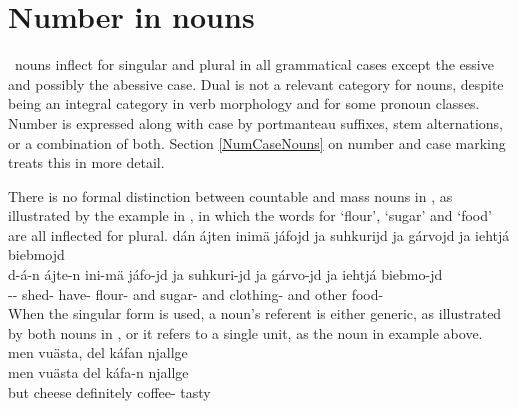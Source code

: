 \section{Number in nouns}\label{numberNouns}
\PS\ nouns inflect for singular and plural in all grammatical cases except the essive and possibly the abessive case. Dual is not a relevant category for nouns, despite being an integral category in verb morphology %
and for some pronoun classes. Number is expressed along with case by portmanteau suffixes, stem alternations, or a combination of both. %
Section \ref{NumCaseNouns} on number and case marking %
treats this in more detail.

There is no formal distinction between countable and mass nouns in \PS, as illustrated by the example in , in which the words for ‘flour’, ‘sugar’ and ‘food’ are all inflected for plural. %
\ea\label{uncountableEx1}
\glll	dán ájten inimä jáfojd ja suhkurijd ja gárvojd ja iehtjá biebmojd\\
	d-á-n ájte-n ini-mä jáfo-jd ja suhkuri-jd ja gárvo-jd ja iehtjá biebmo-jd\\
	-- shed- have- flour- and sugar- and clothing- and other food-\\\nopagebreak
{}	
\z
When the singular form is used, a noun’s referent is either generic, as illustrated by both nouns in , or it refers to a single unit, %
as the noun  in example  above. 
\ea\label{uncountableEx2}
\glll	men vuästa, del káfan njallge\\
	men vuästa del káfa-n njallge\\
	but cheese\BS{} definitely coffee- tasty\\\nopagebreak
{}	
\z


